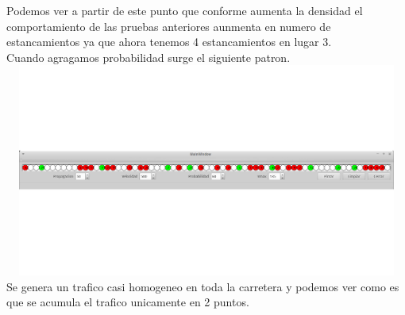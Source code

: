\documentclass[a4paper,10pt]{article}
\begin{document}
Podemos ver a partir de este punto que conforme aumenta la densidad el comportamiento de las pruebas anteriores aunmenta en numero de estancamientos ya que ahora tenemos 4 estancamientos en lugar 3.\\
Cuando agragamos probabilidad surge el siguiente patron.
\\
\includegraphics[width=15cm, height=7cm]{27}
\\
Se genera un trafico casi homogeneo en toda la carretera y podemos ver como es que se acumula el trafico unicamente en 2 puntos.
\end{document}
